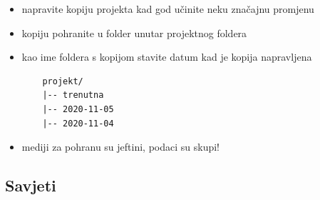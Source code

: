 \documentclass[aspectratio=169]{beamer}
\begin{document}
\begin{frame}[fragile]
    \begin{itemize}
        \setlength{\itemsep}{2em}

        \item napravite kopiju projekta kad god učinite neku značajnu promjenu

        \pause

        \item kopiju pohranite u folder unutar projektnog foldera

        \item kao ime foldera s kopijom stavite datum kad je kopija napravljena

        \pause

        \begin{lstlisting}
    projekt/
    |-- trenutna
    |-- 2020-11-05
    |-- 2020-11-04
        \end{lstlisting}

        \pause

        \item mediji za pohranu su jeftini, podaci su skupi!

    \end{itemize}
\end{frame}

\subsection{Savjeti}
\end{document}
